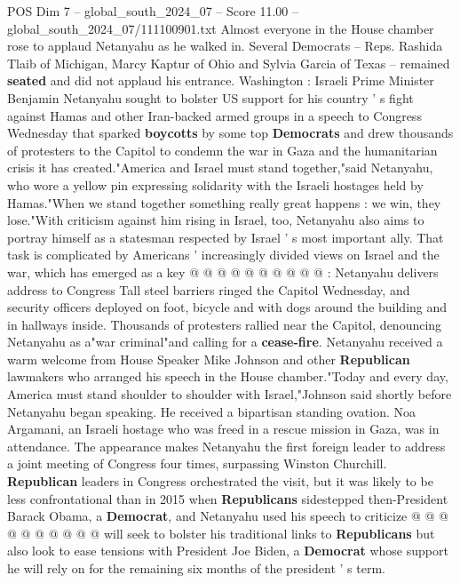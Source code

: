 \begin{textsample}{POS Dim 7 – global\_south\_2024\_07 – Score 11.00 – global\_south\_2024\_07/111100901.txt}  \label{ex:f7_pos_102}
Almost everyone in the House chamber rose to applaud Netanyahu as he walked in.
Several Democrats -- Reps.
Rashida Tlaib of Michigan, Marcy Kaptur of Ohio and Sylvia Garcia of Texas -- remained \textbf{seated} and did not applaud his entrance.
Washington : Israeli Prime Minister Benjamin Netanyahu sought to bolster US support for his country ' s fight against Hamas and other Iran-backed armed groups in a speech to Congress Wednesday that sparked \textbf{boycotts} by some top \textbf{Democrats} and drew thousands of protesters to the Capitol to condemn the war in Gaza and the humanitarian crisis it has created."America and Israel must stand together,"said Netanyahu, who wore a yellow pin expressing solidarity with the Israeli hostages held by Hamas."When we stand together something really great happens : we win, they lose."With criticism against him rising in Israel, too, Netanyahu also aims to portray himself as a statesman respected by Israel ' s most important ally.
That task is complicated by Americans ' increasingly divided views on Israel and the war, which has emerged as a key @ @ @ @ @ @ @ @ @ @ : Netanyahu delivers address to Congress Tall steel barriers ringed the Capitol Wednesday, and security officers deployed on foot, bicycle and with dogs around the building and in hallways inside.
Thousands of protesters rallied near the Capitol, denouncing Netanyahu as a"war criminal"and calling for a \textbf{cease-fire}.
Netanyahu received a warm welcome from House Speaker Mike Johnson and other \textbf{Republican} lawmakers who arranged his speech in the House chamber."Today and every day, America must stand shoulder to shoulder with Israel,"Johnson said shortly before Netanyahu began speaking.
He received a bipartisan standing ovation.
Noa Argamani, an Israeli hostage who was freed in a rescue mission in Gaza, was in attendance.
The appearance makes Netanyahu the first foreign leader to address a joint meeting of Congress four times, surpassing Winston Churchill. \textbf{Republican} leaders in Congress orchestrated the visit, but it was likely to be less confrontational than in 2015 when \textbf{Republicans} sidestepped then-President Barack Obama, a \textbf{Democrat}, and Netanyahu used his speech to criticize @ @ @ @ @ @ @ @ @ @ will seek to bolster his traditional links to \textbf{Republicans} but also look to ease tensions with President Joe Biden, a \textbf{Democrat} whose support he will rely on for the remaining six months of the president ' s term.

\end{textsample}
